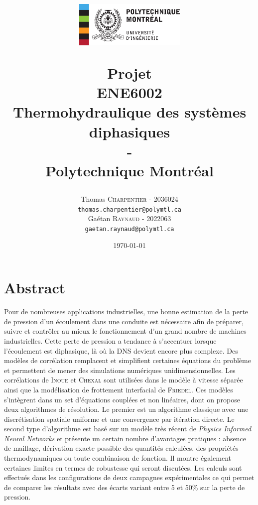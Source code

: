 \documentclass[12pt]{article}
\title{
\centerline{\includegraphics[width=0.4\textwidth]{images/poly}}
\vspace{0.5 cm}
Projet \\
\vspace{1cm}
ENE6002
\large  \\
Thermohydraulique des systèmes diphasiques \\ 
\Huge-\\
\normalsize Polytechnique Montréal
  }
\author{
    \begin{minipage}{.46\textwidth}
        \begin{center}
            Thomas \textsc{Charpentier} - 2036024\\
            \texttt{thomas.charpentier@polymtl.ca}
        \end{center}
    \end{minipage}%
    \hfill\vrule\hfill
    \begin{minipage}{0.46\textwidth}
        \begin{center}
            Gaétan \textsc{Raynaud} - 2022063\\
            \texttt{gaetan.raynaud@polymtl.ca}
        \end{center}
    \end{minipage}
}
\date{\today}
\begin{document}
\maketitle
\section*{Abstract}

Pour de nombreuses applications industrielles, une bonne estimation de la perte de pression d'un écoulement dans une conduite est nécessaire afin de préparer, suivre et contrôler au mieux le fonctionnement d'un grand nombre de machines industrielles. Cette perte de pression a tendance à s'accentuer lorsque l'écoulement est diphasique, là où la DNS devient encore plus complexe. Des modèles de corrélation remplacent et simplifient certaines équations du problème et permettent de mener des simulations numériques unidimensionnelles. Les corrélations de \textsc{Inoue} et \textsc{Chexal} sont utilisées dans le modèle à vitesse séparée ainsi que la modélisation de frottement interfacial de \textsc{Friedel}. Ces modèles s'intègrent dans un set d'équations couplées et non linéaires, dont on propose deux algorithmes de résolution. Le premier est un algorithme \og classique\fg{} avec une discrétisation spatiale uniforme et une convergence par itération directe. Le second type d'algorithme est basé sur un modèle très récent de \textit{Physics Informed Neural Networks} et présente un certain nombre d'avantages pratiques : absence de maillage, dérivation exacte possible des quantités calculées, des propriétés thermodynamiques ou toute combinaison de fonction. Il montre également certaines limites en termes de robustesse qui seront discutées. Les calculs sont effectués dans les configurations de deux campagnes expérimentales ce qui permet de comparer les résultats avec des écarts variant entre 5 et 50\% sur la perte de pression.

\newpage
\tableofcontents
\newpage

\newpage

\newpage

\newpage

\newpage

\newpage

\newpage

\newpage
%

\FloatBarrier
\newpage


\end{document}
